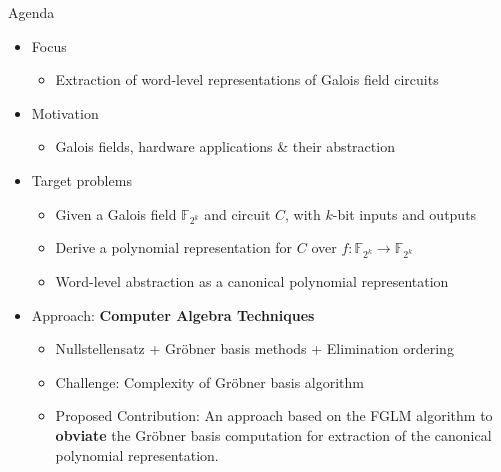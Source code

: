 \documentclass[xcolor=dvipsnames]{beamer}
\newcommand{\Fkk}{{\mathbb{F}}_{2^k}}
\newcommand{\Grobner}{Gr\"{o}bner\xspace}
\begin{document}
\begin{frame}{\large{Agenda}}

\begin{itemize}
\item Focus
	\begin{itemize}
	\item Extraction of word-level representations of Galois field circuits
	\end{itemize}
\item Motivation
	\begin{itemize}
	\item Galois fields, hardware applications \& their abstraction
	\end{itemize}
\item Target problems 
	\begin{itemize}
	\item Given a Galois field $\Fkk$ and circuit $C$, with $k$-bit inputs and outputs
        \item Derive a polynomial representation for $C$ over $f: \Fkk \rightarrow \Fkk$ 
        \item \alert{Word-level abstraction} as a canonical polynomial representation
	\end{itemize}
\item Approach: {\bf Computer Algebra Techniques}
	\begin{itemize}
	\item  Nullstellensatz + \Grobner basis methods + Elimination ordering
        \item  Challenge: Complexity of \Grobner basis algorithm
        \item  Proposed Contribution: An approach based on the FGLM algorithm to {\bf obviate} the
          \Grobner basis computation for extraction of the canonical polynomial representation.
	\end{itemize}
\end{itemize}
\end{frame}
\end{document}
